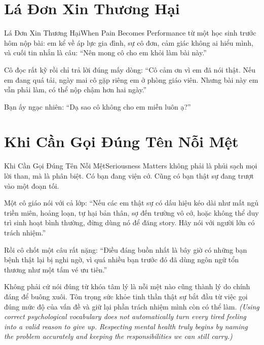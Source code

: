 \section{Lá Đơn Xin Thương Hại}
\begin{truyen}{Lá Đơn Xin Thương Hại}{When Pain Becomes Performance}
 từ một học sinh trước hôm nộp bài: em kể về áp lực gia đình, sự cô đơn, cảm giác không ai hiểu mình, và cuối tin nhắn là câu: ``Nên mong cô cho em khỏi làm bài này.''

Cô đọc rất kỹ rồi chỉ trả lời đúng mấy dòng: ``Cô cảm ơn vì em đã nói thật. Nếu em đang quá tải, ngày mai cô gặp riêng em ở phòng giáo viên. Nhưng bài này em vẫn phải làm, có thể nộp chậm hơn hai ngày.''

Bạn ấy ngạc nhiên: ``Dạ sao cô không cho em miễn luôn ạ?''

\end{truyen}

\section{Khi Cần Gọi Đúng Tên Nỗi Mệt}
\begin{truyen}{Khi Cần Gọi Đúng Tên Nỗi Mệt}{Seriousness Matters}
 không phải là phủi sạch mọi lời than, mà là phân biệt. Có bạn đang viện cớ. Cũng có bạn thật sự đang trượt vào một đoạn tối.

Một cô giáo nói với cả lớp: ``Nếu các em thật sự có dấu hiệu kéo dài như mất ngủ triền miên, hoảng loạn, tự hại bản thân, sợ đến trường vô cớ, hoặc không thể duy trì sinh hoạt bình thường, đừng dùng nó để đăng story. Hãy nói với người lớn có trách nhiệm.''

Rồi cô chốt một câu rất nặng: ``Điều đáng buồn nhất là bây giờ có những bạn bệnh thật lại bị nghi ngờ, vì quá nhiều bạn trước đó đã dùng ngôn ngữ tổn thương như một tấm vé ưu tiên.''
\end{truyen}

\begin{baihoc}
Không phải cứ nói đúng từ khóa tâm lý là nỗi mệt nào cũng thành lý do chính đáng để buông xuôi. Tôn trọng sức khỏe tinh thần thật sự bắt đầu từ việc gọi đúng mức độ của vấn đề và giữ lại phần trách nhiệm mình còn có thể làm.
\textit{(Using correct psychological vocabulary does not automatically turn every tired feeling into a valid reason to give up. Respecting mental health truly begins by naming the problem accurately and keeping the responsibilities we can still carry.)}
\end{baihoc}

